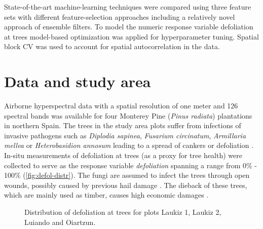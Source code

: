 \documentclass[review]{elsarticle}
\begin{document}
\noindent State-of-the-art machine-learning techniques were compared using three feature sets with different feature-selection approaches including a relatively novel approach of ensemble filters.
To model the numeric response variable defoliation at trees model-based optimization was applied for hyperparameter tuning.
Spatial block \ac{CV} was used to account for spatial autocorrelation in the data.

\section{Data and study area}
\noindent Airborne hyperspectral data with a spatial resolution of one meter and 126 spectral bands was available for four Monterey Pine (\textit{Pinus radiata}) plantations in northern Spain.
The trees in the study area plots suffer from infections of invasive pathogens such as \textit{Diplodia sapinea}, \textit{Fusarium circinatum}, \textit{Armillaria mellea} or \textit{Heterobasidion annosum} leading to a spread of cankers or defoliation \citep{mesanza2016, iturritxa2017}.
In-situ measurements of defoliation at trees (as a proxy for tree health) were collected to serve as the response variable \textit{defoliation} spanning a range from 0\% - 100\% (\autoref{fig:defol-distr}).
The fungi are assumed to infect the trees through open wounds, possibly caused by previous hail damage \citep{iturritxa2014}.
The dieback of these trees, which are mainly used as timber, causes high economic damages \citep{ganley2009}.

\begin{figure} [t!]
\begin{center}
\caption{Distribution of defoliation at trees for plots Laukiz 1, Laukiz 2, Luiando and Oiartzun.}
\label{fig:defol-distr}
\end{center}
\end{figure}
\end{document}
